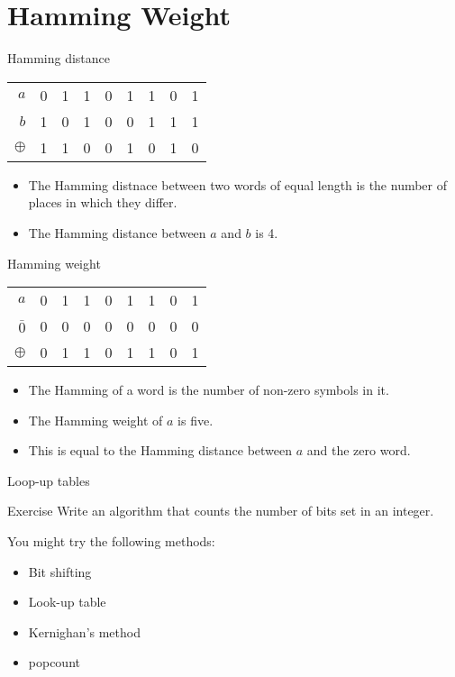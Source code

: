 \documentclass{beamer}
\begin{document}
\section{Hamming Weight}

\begin{frame}{Hamming distance}
  \begin{table}
    \centering
    \begin{tabular}{rcccccccc}
      \toprule
      $a$      & 0 & 1 & 1 & 0 & 1 & 1 & 0 & 1 \\
      $b$      & 1 & 0 & 1 & 0 & 0 & 1 & 1 & 1 \\
      \midrule
      $\oplus$ & 1 & 1 & 0 & 0 & 1 & 0 & 1 & 0 \\
      \bottomrule
    \end{tabular}
  \end{table}
  \begin{itemize}
    \item The Hamming distnace between two words of equal length is the number of places in which they differ.
    \item The Hamming distance between $a$ and $b$ is 4.
  \end{itemize}
\end{frame}

\begin{frame}{Hamming weight}
  \begin{table}
    \centering
    \begin{tabular}{rcccccccc}
      \toprule
      $a$      & 0 & 1 & 1 & 0 & 1 & 1 & 0 & 1 \\
      $\bar{0}$      & 0 & 0 & 0 & 0 & 0 & 0 & 0 & 0 \\
      \midrule
      $\oplus$ & 0 & 1 & 1 & 0 & 1 & 1 & 0 & 1 \\
      \bottomrule
    \end{tabular}
  \end{table}
  \begin{itemize}
    \item The Hamming of a word is the number of non-zero symbols in it.
    \item The Hamming weight of $a$ is five.
    \item This is equal to the Hamming distance between $a$ and the zero word.
  \end{itemize}
\end{frame}


\begin{frame}{Loop-up tables}
  \begin{exampleblock}{Exercise}
    Write an algorithm that counts the number of bits set in an integer.
  \end{exampleblock}
  
  \pause
  
  You might try the following methods:
  \begin{itemize}
    \item Bit shifting
    \item Look-up table
    \item Kernighan's method
    \item popcount
  \end{itemize}
\end{frame}
\end{document}
